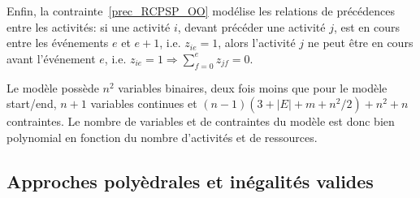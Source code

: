 Enfin, la contrainte~\eqref{prec_RCPSP_OO} modélise les relations
de précédences entre les activités: si une activité $i$, devant
précéder une activité $j$, est en cours entre les événements $e$
et $e+1$, i.e. $z_{ie}=1$, alors l'activité $j$ ne peut être en
cours avant l'événement $e$, i.e. $z_{ie}=1 \Rightarrow
\sum_{f=0}^e z_{jf}=0 $.

Le modèle possède $n^2$ variables binaires, deux fois moins que
pour le modèle start/end, $n+1$ variables continues et
$(n-1)(3+|E|+m+n^2/2)+n^2+n$ contraintes. Le nombre de variables
et de contraintes du modèle est donc bien polynomial en fonction
du nombre d'activités et de ressources.



\subsection{Approches polyèdrales et inégalités valides}
\label{sec:ineg_RCPSP}